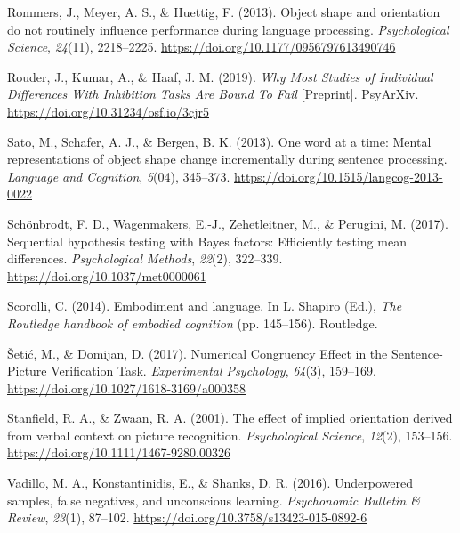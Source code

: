 \documentclass[
  man]{apa7}
\newlength{\cslhangindent}
\newlength{\cslentryspacingunit} %
\newenvironment{CSLReferences}[2] %
 {%
  \setlength{\parindent}{0pt}
  \ifodd #1
  \let\oldpar\par
  \def\par{\hangindent=\cslhangindent\oldpar}
  \fi
  \setlength{\parskip}{#2\cslentryspacingunit}
 }%
 {}
\begin{document}
\begin{CSLReferences}{1}{0}
\leavevmode{}%
Rommers, J., Meyer, A. S., \& Huettig, F. (2013). Object shape and orientation do not routinely influence performance during language processing. \emph{Psychological Science}, \emph{24}(11), 2218--2225. \url{https://doi.org/10.1177/0956797613490746}

\leavevmode{}%
Rouder, J., Kumar, A., \& Haaf, J. M. (2019). \emph{Why {Most Studies} of {Individual Differences With Inhibition Tasks Are Bound To Fail}} {[}Preprint{]}. {PsyArXiv}. \url{https://doi.org/10.31234/osf.io/3cjr5}

\leavevmode{}%
Sato, M., Schafer, A. J., \& Bergen, B. K. (2013). One word at a time: {Mental} representations of object shape change incrementally during sentence processing. \emph{Language and Cognition}, \emph{5}(04), 345--373. \url{https://doi.org/10.1515/langcog-2013-0022}

\leavevmode{}%
Schönbrodt, F. D., Wagenmakers, E.-J., Zehetleitner, M., \& Perugini, M. (2017). Sequential hypothesis testing with {Bayes} factors: {Efficiently} testing mean differences. \emph{Psychological Methods}, \emph{22}(2), 322--339. \url{https://doi.org/10.1037/met0000061}

\leavevmode{}%
Scorolli, C. (2014). Embodiment and language. In L. Shapiro (Ed.), \emph{The {Routledge} handbook of embodied cognition} (pp. 145--156). {Routledge}.

\leavevmode{}%
Šetić, M., \& Domijan, D. (2017). Numerical {Congruency Effect} in the {Sentence-Picture Verification Task}. \emph{Experimental Psychology}, \emph{64}(3), 159--169. \url{https://doi.org/10.1027/1618-3169/a000358}

\leavevmode{}%
Stanfield, R. A., \& Zwaan, R. A. (2001). The effect of implied orientation derived from verbal context on picture recognition. \emph{Psychological Science}, \emph{12}(2), 153--156. \url{https://doi.org/10.1111/1467-9280.00326}

\leavevmode{}%
Vadillo, M. A., Konstantinidis, E., \& Shanks, D. R. (2016). Underpowered samples, false negatives, and unconscious learning. \emph{Psychonomic Bulletin \& Review}, \emph{23}(1), 87--102. \url{https://doi.org/10.3758/s13423-015-0892-6}


\end{CSLReferences}
\end{document}
